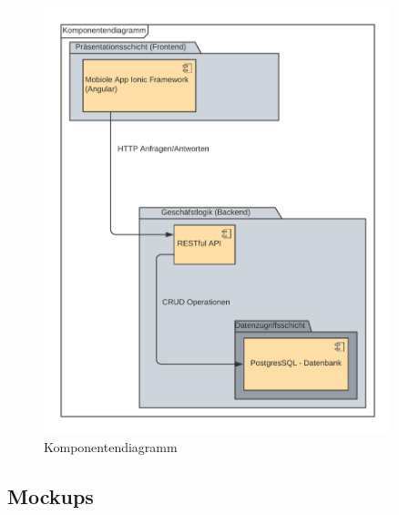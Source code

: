 \documentclass[a4paper,12pt]{article}
\begin{document}
\begin{figure}[h]
\centering
\includegraphics[width=0.9\textwidth]{bilder/Komponentendiagramm2.png}
\caption{Komponentendiagramm}
\end{figure}

\clearpage
\subsection{Mockups}
\label{sec:mockups}
\end{document}
